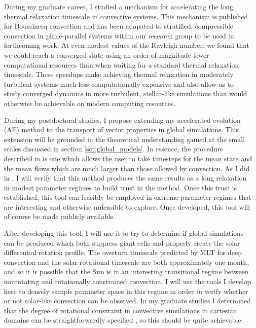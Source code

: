\documentclass[aasms,12pt]{article}
\begin{document}
During my graduate career, I studied a mechanism for accelerating the long thermal relaxation timescale in convective systems.
This mechanism is published for Boussinesq convection \citep{anders&all2018} and has been adapated to stratified, compressible convection in plane-parallel systems within our research group to be used in forthcoming work.
At even modest values of the Rayleigh number, we found that we could reach a converged state using an order of magnitude fewer computational resources than when waiting for a standard thermal relaxation timescale.
These speedups make achieving thermal relaxation in moderately turbulent systems much less computationally expensive and also allow us to study converged dynamics in more turbulent, stellar-like simulations than would otherwise be achievable on modern computing resources.

During my postdoctoral studies, I propose extending my accelerated evolution (AE) method to the transport of vector properties in global simulations.
This extension will be grounded in the theoretical understanding gained at the small scales discussed in section \ref{sct:global_models}.
In essence, the procedure described in \citet{ander&all2018} is one which allows the user to take timesteps for the mean state and the mean flows which are much larger than those allowed by convection.
As I did in \citet{anders&all2018}, I will verify that this method produces the same results as a long relaxation in modest parameter regimes to build trust in the method.
Once this trust is established, this tool can feasibly be employed in extreme parameter regimes that are interesting and otherwise unfeasible to explore.
Once developed, this tool will of course be made publicly available.

After developing this tool, I will use it to try to determine if global simulations can be produced which both suppress giant cells and properly create the solar differential rotation profile.
The overturn timescale predicted by MLT for deep convection and the solar rotational timescale are both approximately one month, and so it is possible that the Sun is in an interesting transitional regime between nonrotating and rotationally constrained convection.
I will use the tools I develop here to densely sample parameter space in this regime in order to verify whether or not solar-like convection can be observed.
In my graduate studies I determined that the degree of rotational constraint in convective simulations in cartesian domains can be straightforwardly specified \citep{anders&all2019}, so this should be quite achievable.
\end{document}
